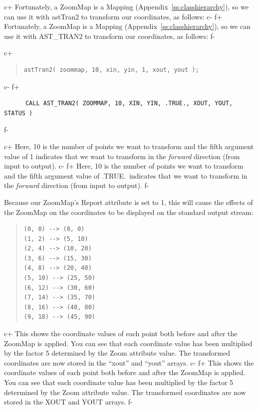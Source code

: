 \documentclass[twoside,11pt]{article}
\newcommand{\appref}[1]{Appendix~\ref{#1}}
\newcommand{\appref}[1]{\ref{#1}}
\begin{document}
c+
Fortunately, a ZoomMap is a Mapping (\appref{ss:classhierarchy}), so we
can use it with astTran2 to transform our coordinates, as follows:
c-
f+
Fortunately, a ZoomMap is a Mapping (\appref{ss:classhierarchy}), so we
can use it with AST\_TRAN2 to transform our coordinates, as follows:
f-

c+
\begin{quote}
\small
\begin{verbatim}
astTran2( zoommap, 10, xin, yin, 1, xout, yout );
\end{verbatim}
\normalsize
\end{quote}
c-
f+
\small
\begin{verbatim}
      CALL AST_TRAN2( ZOOMMAP, 10, XIN, YIN, .TRUE., XOUT, YOUT, STATUS )
\end{verbatim}
\normalsize
f-

c+
Here, 10 is the number of points we want to transform and the fifth
argument value of 1 indicates that we want to transform in the
{\em{forward}} direction (from input to output).
c-
f+
Here, 10 is the number of points we want to transform and the fifth
argument value of .TRUE.\ indicates that we want to transform in the
{\em{forward}} direction (from input to output).
f-

Because our ZoomMap's Report attribute is set to 1, this will cause
the effects of the ZoomMap on the coordinates to be displayed on the
standard output stream:

\begin{quote}
\small
\begin{verbatim}
(0, 0) --> (0, 0)
(1, 2) --> (5, 10)
(2, 4) --> (10, 20)
(3, 6) --> (15, 30)
(4, 8) --> (20, 40)
(5, 10) --> (25, 50)
(6, 12) --> (30, 60)
(7, 14) --> (35, 70)
(8, 16) --> (40, 80)
(9, 18) --> (45, 90)
\end{verbatim}
\normalsize
\end{quote}

c+
This shows the coordinate values of each point both before and after
the ZoomMap is applied. You can see that each coordinate value has
been multiplied by the factor 5 determined by the Zoom attribute
value. The transformed coordinates are now stored in the ``xout'' and
``yout'' arrays.
c-
f+
This shows the coordinate values of each point both before and after
the ZoomMap is applied. You can see that each coordinate value has
been multiplied by the factor 5 determined by the Zoom attribute
value. The transformed coordinates are now stored in the XOUT and YOUT
arrays.
f-
\end{document}
